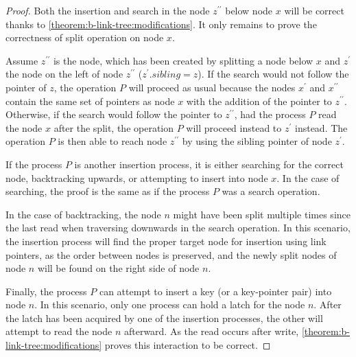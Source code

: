 \begin{proof}
  Both the insertion and search in the node $z^{\prime\prime}$ below node $x$ will be correct thanks to \cref{theorem:b-link-tree:modifications}. It only remains to prove the correctness of split operation on node $x$.

  Assume $z^{\prime\prime}$ is the node, which has been created by splitting a node below $x$ and $z^\prime$ the node on the left of node $z^{\prime\prime}$ ($z^\prime.\mathit{sibling} = z$). If the search would not follow the pointer of $z$, the operation $P$ will proceed as usual because the nodes $x^\prime$ and $x^{\prime\prime}$ contain the same set of pointers as node $x$ with the addition of the pointer to $z^{\prime\prime}$. Otherwise, if the search would follow the pointer to $z^{\prime\prime}$, had the process $P$ read the node $x$ after the split, the operation $P$ will proceed instead to $z^\prime$ instead. The operation $P$ is then able to reach node $z^{\prime\prime}$ by using the sibling pointer of node $z^\prime$.

  If the process $P$ is another insertion process, it is either searching for the correct node, backtracking upwards, or attempting to insert into node $x$. In the case of searching, the proof is the same as if the process $P$ was a search operation.

  In the case of backtracking, the node $n$ might have been split multiple times since the last read when traversing downwards in the search operation. In this scenario, the insertion process will find the proper target node for insertion using link pointers, as the order between nodes is preserved, and the newly split nodes of node $n$ will be found on the right side of node $n$.

  Finally, the process $P$ can attempt to insert a key (or a key-pointer pair) into node $n$. In this scenario, only one process can hold a latch for the node $n$. After the latch has been acquired by one of the insertion processes, the other will attempt to read the node $n$ afterward. As the read occurs after write, \cref{theorem:b-link-tree:modifications} proves this interaction to be correct.

\end{proof}

